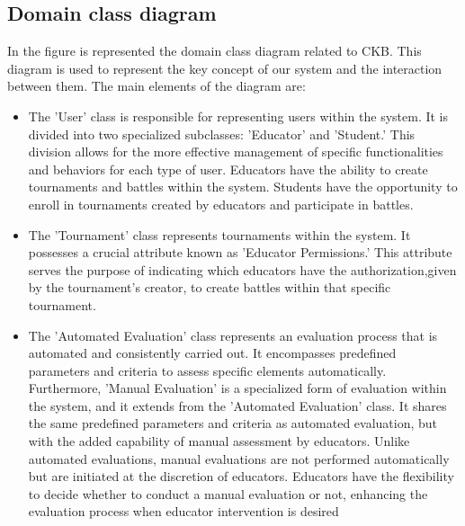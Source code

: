 \subsection{Domain class diagram}
In the figure is represented the domain class diagram related to CKB. This diagram is used  to represent the key concept of our system and the interaction between them.
The main elements of the diagram are:
\begin{itemize}
    \item The 'User' class is responsible for representing users within the system. It is divided into two specialized subclasses: 'Educator' and 'Student.' This division allows for the more effective management of specific functionalities and behaviors for each type of user. Educators have the ability to create tournaments and battles within the system. Students have the opportunity to enroll in tournaments created by educators and participate in battles.
    \item The 'Tournament' class represents tournaments within the system. It possesses a crucial attribute known as 'Educator Permissions.' This attribute serves the purpose of indicating which educators have the authorization,given by the tournament's creator, to create battles within that specific tournament.
    \item  The 'Automated Evaluation' class represents an evaluation process that is automated and consistently carried out. It encompasses predefined parameters and criteria to assess specific elements automatically. Furthermore, 'Manual Evaluation' is a specialized form of evaluation within the system, and it extends from the 'Automated Evaluation' class. It shares the same predefined parameters and criteria as automated evaluation, but with the added capability of manual assessment by educators. Unlike automated evaluations, manual evaluations are not performed automatically but are initiated at the discretion of educators. Educators have the flexibility to decide whether to conduct a manual evaluation or not, enhancing the evaluation process when educator intervention is desired
\end{itemize}

